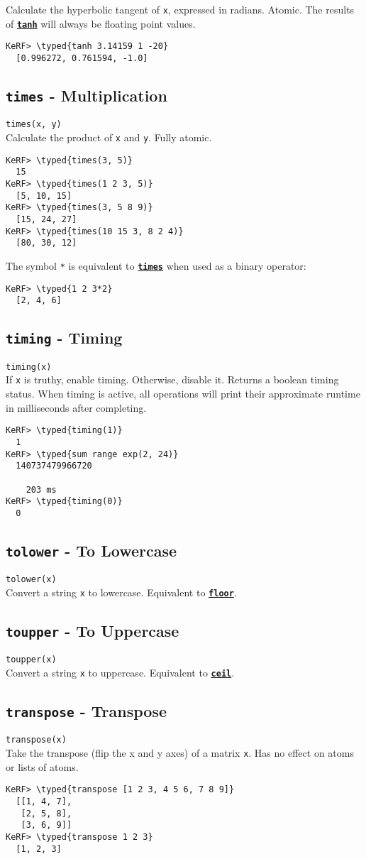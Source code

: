 \documentclass{article}
\newcommand{\typed}[1]{\textcolor{TealBlue}{#1}}
\newcommand{\primdefu}[3]{\subsection{\texttt{#1} - #2}\label{prim:#3}}
\newcommand{\primu}[2]{\hyperref[prim:#2]{\textbf{\texttt{#1}}}}
\newcommand{\primdef}[2]{\primdefu{#1}{#2}{#1}}
\newcommand{\prim}[1]{\primu{#1}{#1}}
\begin{document}
Calculate the hyperbolic tangent of \texttt{x}, expressed in radians. Atomic. The results of \prim{tanh} will always be floating point values.
\begin{Verbatim}
KeRF> \typed{tanh 3.14159 1 -20}
  [0.996272, 0.761594, -1.0]
\end{Verbatim}

\pagebreak
\primdef{times}{Multiplication}
\texttt{times(x, y)}\\

Calculate the product of \texttt{x} and \texttt{y}. Fully atomic.
\begin{Verbatim}
KeRF> \typed{times(3, 5)}
  15
KeRF> \typed{times(1 2 3, 5)}
  [5, 10, 15]
KeRF> \typed{times(3, 5 8 9)}
  [15, 24, 27]
KeRF> \typed{times(10 15 3, 8 2 4)}
  [80, 30, 12]
\end{Verbatim}

The symbol \texttt{*} is equivalent to \prim{times} when used as a binary operator:
\begin{Verbatim}
KeRF> \typed{1 2 3*2}
  [2, 4, 6]
\end{Verbatim}

\primdef{timing}{Timing}
\texttt{timing(x)}\\

If \texttt{x} is truthy, enable timing. Otherwise, disable it. Returns a boolean timing status. When timing is active, all operations will print their approximate runtime in milliseconds after completing.
\begin{Verbatim}
KeRF> \typed{timing(1)}
  1
KeRF> \typed{sum range exp(2, 24)}
  140737479966720

    203 ms
KeRF> \typed{timing(0)}
  0
\end{Verbatim}

\primdef{tolower}{To Lowercase}
\texttt{tolower(x)}\\

Convert a string \texttt{x} to lowercase. Equivalent to \prim{floor}.

\primdef{toupper}{To Uppercase}
\texttt{toupper(x)}\\

Convert a string \texttt{x} to uppercase. Equivalent to \prim{ceil}.

\pagebreak
\primdef{transpose}{Transpose}
\texttt{transpose(x)}\\

Take the transpose (flip the x and y axes) of a matrix \texttt{x}. Has no effect on atoms or lists of atoms.
\begin{Verbatim}
KeRF> \typed{transpose [1 2 3, 4 5 6, 7 8 9]}
  [[1, 4, 7], 
   [2, 5, 8], 
   [3, 6, 9]]
KeRF> \typed{transpose 1 2 3}
  [1, 2, 3]
\end{Verbatim}
\end{document}
